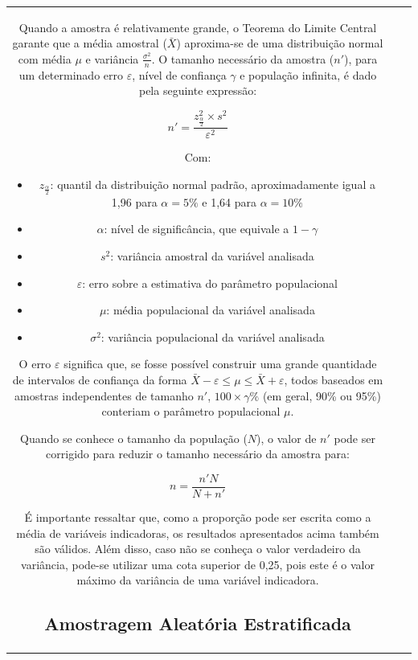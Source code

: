 \documentclass[
]{estat/estat}
\providecommand{\tightlist}{%
  \setlength{\itemsep}{0pt}\setlength{\parskip}{0pt}}\usepackage{longtable,booktabs,array}
\begin{document}
\begin{tabular}{c|cc}
Quando a amostra é relativamente grande, o Teorema do Limite Central
garante que a média amostral (\(\bar{X}\)) aproxima-se de uma
distribuição normal com média \(\mu\) e variância
\(\frac{\sigma^2}{n}\). O tamanho necessário da amostra (\(n'\)), para
um determinado erro \(\varepsilon\), nível de confiança \(\gamma\) e
população infinita, é dado pela seguinte expressão:

\[
n' = \frac{z^2_{\frac{\alpha}{2}} \times s^2}{\varepsilon^2}
\]

Com:

\begin{itemize}
\tightlist
\item
  \(z_{\frac{\alpha}{2}}\): quantil da distribuição normal padrão,
  aproximadamente igual a 1,96 para \(\alpha = 5\%\) e 1,64 para
  \(\alpha = 10\%\)
\item
  \(\alpha\): nível de significância, que equivale a \(1 - \gamma\)
\item
  \(s^2\): variância amostral da variável analisada
\item
  \(\varepsilon\): erro sobre a estimativa do parâmetro populacional
\item
  \(\mu\): média populacional da variável analisada
\item
  \(\sigma^2\): variância populacional da variável analisada
\end{itemize}

O erro \(\varepsilon\) significa que, se fosse possível construir uma
grande quantidade de intervalos de confiança da forma
\(\bar{X} - \varepsilon \leq \mu \leq \bar{X} + \varepsilon\), todos
baseados em amostras independentes de tamanho \(n'\),
\(100 \times \gamma\%\) (em geral, 90\% ou 95\%) conteriam o parâmetro
populacional \(\mu\).

Quando se conhece o tamanho da população (\(N\)), o valor de \(n'\) pode
ser corrigido para reduzir o tamanho necessário da amostra para:

\[
n = \frac{n'N}{N+n'}
\]

É importante ressaltar que, como a proporção pode ser escrita como a
média de variáveis indicadoras, os resultados apresentados acima também
são válidos. Além disso, caso não se conheça o valor verdadeiro da
variância, pode-se utilizar uma cota superior de 0,25, pois este é o
valor máximo da variância de uma variável indicadora.

\hypertarget{amostragem-aleatuxf3ria-estratificada}{%
\subsection{Amostragem Aleatória
Estratificada}\label{amostragem-aleatuxf3ria-estratificada}}


\end{tabular}
\end{document}
